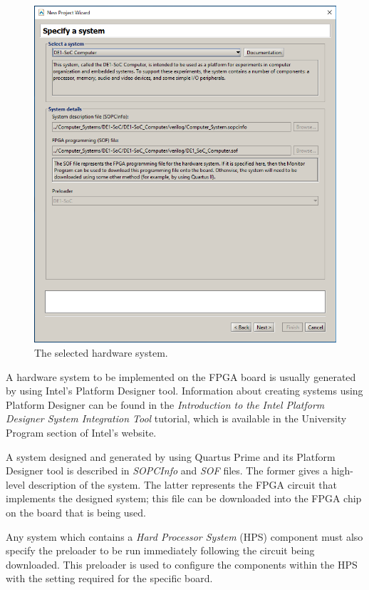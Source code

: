 \documentclass[11pt, twoside, pdftex]{article}
\begin{document}
\begin{figure}[H]
   \begin{center}
      \includegraphics[scale=0.5]{screenshots/figure7.png}
   \end{center}
   \caption{The selected hardware system.} 
   \label{fig:NPW_systemselect_done}
\end{figure}

A hardware system to be implemented on the FPGA board is usually
generated by using Intel's Platform Designer tool.
Information about creating systems using Platform Designer can be found in the \emph{Introduction to the Intel Platform Designer System Integration Tool} tutorial, which is available in the University Program section of
Intel's website.

A system designed and generated by using Quartus Prime and its Platform Designer
tool is described in \emph{SOPCInfo} and \emph{SOF} files. The
former gives a high-level description of the system. 
The latter represents the FPGA
circuit that implements the designed system; this file can be downloaded into the FPGA chip on the board that is being used. 

Any system which contains a {\it Hard Processor System} (HPS) component must also specify the preloader to be run immediately following the circuit being downloaded. This preloader is used to configure the components within the HPS with the setting required for the specific board. 
\end{document}
